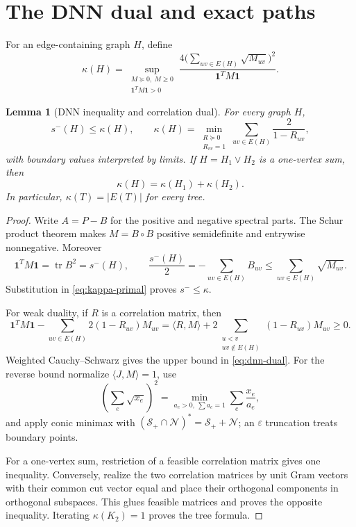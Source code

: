 \documentclass[11pt]{article}
\newtheorem{lemma}[theorem]{Lemma}
\theoremstyle{remark}
\newcommand{\sminus}{s^-}
\newcommand{\one}{\mathbf 1}
\newcommand{\kap}{\kappa}
\begin{document}
\section{The DNN dual and exact paths}

For an edge-containing graph $H$, define
\begin{equation}\label{eq:kappa-primal}
 \kap(H)=\sup_{\substack{M\succeq0,\ M\geq0\\\one^TM\one>0}}
 \frac{4\bigl(\sum_{uv\in E(H)}\sqrt{M_{uv}}\bigr)^2}
 {\one^TM\one}.
\end{equation}

\begin{lemma}[DNN inequality and correlation dual]\label{lem:dnn}
For every graph $H$,
\begin{equation}\label{eq:dnn-dual}
 \sminus(H)\leq\kap(H),
 \qquad
 \kap(H)=\min_{\substack{R\succeq0\\R_{vv}=1}}
 \sum_{uv\in E(H)}\frac{2}{1-R_{uv}},
\end{equation}
with boundary values interpreted by limits.  If $H=H_1\vee H_2$ is a
one-vertex sum, then
\[
 \kap(H)=\kap(H_1)+\kap(H_2).
\]
In particular, $\kap(T)=|E(T)|$ for every tree.
\end{lemma}

\begin{proof}
Write $A=P-B$ for the positive and negative spectral parts.  The Schur product
theorem makes $M=B\circ B$ positive semidefinite and entrywise nonnegative.
Moreover
\[
 \one^TM\one=\operatorname{tr}B^2=\sminus(H),
 \qquad
 \frac{\sminus(H)}2=-\sum_{uv\in E(H)}B_{uv}
 \leq\sum_{uv\in E(H)}\sqrt{M_{uv}}.
\]
Substitution in \eqref{eq:kappa-primal} proves $\sminus\leq\kap$.

For weak duality, if $R$ is a correlation matrix, then
\[
 \one^TM\one-
 \sum_{uv\in E(H)}2(1-R_{uv})M_{uv}
 =\langle R,M\rangle+
 2\sum_{\substack{u<v\\uv\notin E(H)}}(1-R_{uv})M_{uv}\geq0.
\]
Weighted Cauchy--Schwarz gives the upper bound in \eqref{eq:dnn-dual}.
For the reverse bound normalize $\langle J,M\rangle=1$, use
\[
 (\sum_e\sqrt{x_e})^2
 =\min_{a_e>0,\ \sum a_e=1}\sum_e\frac{x_e}{a_e},
\]
and apply conic minimax with
$(\mathcal S_+\cap\mathcal N)^*=\mathcal S_++\mathcal N$; an
$\varepsilon$ truncation treats boundary points.

For a one-vertex sum, restriction of a feasible correlation matrix gives one
inequality.  Conversely, realize the two correlation matrices by unit Gram
vectors with their common cut vector equal and place their orthogonal
components in orthogonal subspaces.  This glues feasible matrices and proves
the opposite inequality.  Iterating $\kap(K_2)=1$ proves the tree formula.
\end{proof}
\end{document}
